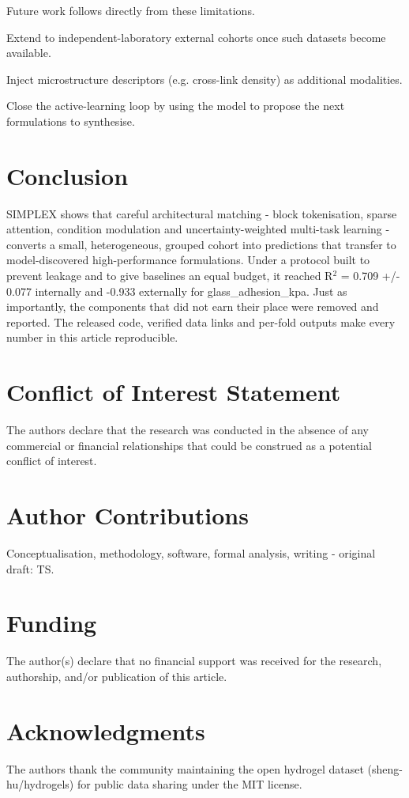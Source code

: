 \documentclass[utf8]{FrontiersinHarvard}
\begin{document}
Future work follows directly from these limitations.

\item Extend to independent-laboratory external cohorts once such datasets become available.
\item Inject microstructure descriptors (e.g. cross-link density) as additional modalities.
\item Close the active-learning loop by using the model to propose the next formulations to synthesise.


\section{Conclusion}

SIMPLEX shows that careful architectural matching - block tokenisation, sparse attention, condition modulation and uncertainty-weighted multi-task learning - converts a small, heterogeneous, grouped cohort into predictions that transfer to model-discovered high-performance formulations. Under a protocol built to prevent leakage and to give baselines an equal budget, it reached R$^2$ = 0.709 +/- 0.077 internally and -0.933 externally for glass_adhesion_kpa. Just as importantly, the components that did not earn their place were removed and reported. The released code, verified data links and per-fold outputs make every number in this article reproducible.

\section*{Conflict of Interest Statement}
The authors declare that the research was conducted in the absence of any commercial or financial relationships that could be construed as a potential conflict of interest.

\section*{Author Contributions}
Conceptualisation, methodology, software, formal analysis, writing - original draft: TS.

\section*{Funding}
The author(s) declare that no financial support was received for the research, authorship, and/or publication of this article.

\section*{Acknowledgments}
The authors thank the community maintaining the open hydrogel dataset (sheng-hu/hydrogels) for public data sharing under the MIT license.
\end{document}

